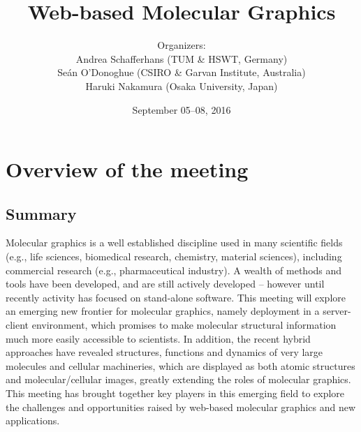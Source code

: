 \documentclass[a4paper]{article}
\begin{document}
\SHONANmakecover

\title{Web-based Molecular Graphics}
\author{Organizers:\\
Andrea Schafferhans (TUM \& HSWT, Germany)\\
Se\'{a}n O'Donoghue (CSIRO \& Garvan Institute, Australia)\\
Haruki Nakamura (Osaka University, Japan)}
\date{September 05--08, 2016}
\maketitle

\section{Overview of the meeting}
\subsection{Summary}
Molecular graphics is a well established discipline used in many scientific fields (e.g., life sciences, biomedical research, chemistry, material sciences), including commercial research (e.g., pharmaceutical industry). A wealth of methods and tools have been developed, and are still actively developed -- however until recently activity has focused on stand-alone software. This meeting will explore an emerging new frontier for molecular graphics, namely deployment in a server-client environment, which promises to make molecular structural information much more easily accessible to scientists. In addition, the recent hybrid approaches have revealed structures, functions and dynamics of very large molecules and cellular machineries, which are displayed as both atomic structures and molecular/cellular images, greatly extending the roles of molecular graphics. This meeting has brought together key players in this emerging field to explore the challenges and opportunities raised by web-based molecular graphics and new applications.
 
\end{document}
